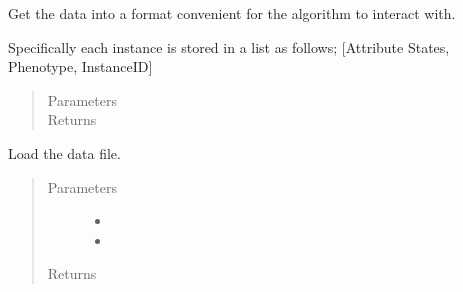 \documentclass[letterpaper,10pt,english]{sphinxmanual}
\begin{document}
\begin{fulllineitems}
\begin{fulllineitems}
\begin{quote}
\begin{description}
\end{description}\end{quote}

\end{fulllineitems}


\begin{fulllineitems}
\label{\detokenize{eLCS:eLCS.DataManagement.DataManagement.formatData}}
Get the data into a format convenient for the algorithm to interact with.

Specifically each instance is stored in a list as follows; {[}Attribute States, Phenotype, InstanceID{]}
\begin{quote}\begin{description}
\item[{Parameters}] \leavevmode
{} \textendash{} 

\item[{Returns}] \leavevmode


\end{description}\end{quote}

\end{fulllineitems}


\begin{fulllineitems}
\label{\detokenize{eLCS:eLCS.DataManagement.DataManagement.loadData}}
Load the data file.
\begin{quote}\begin{description}
\item[{Parameters}] \leavevmode\begin{itemize}
\item {} 
 \textendash{} 

\item {} 
 \textendash{} 

\end{itemize}

\item[{Returns}] \leavevmode


\end{description}\end{quote}

\end{fulllineitems}


\end{fulllineitems}
\end{document}
